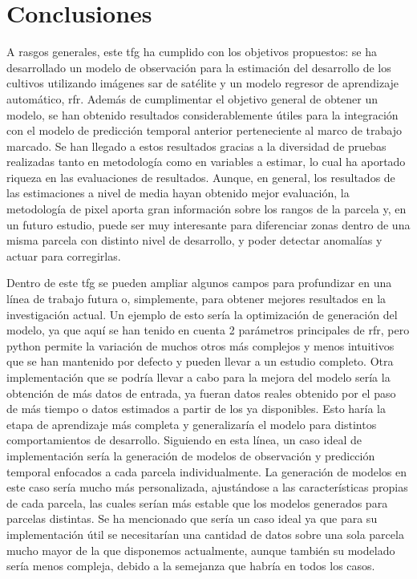 
\chapter{Conclusiones}
\label{conclusiones}
\par A rasgos generales, este \gls{tfg} ha cumplido con los objetivos propuestos: se ha desarrollado un modelo de observación para la estimación del desarrollo de los cultivos utilizando imágenes \gls{sar} de satélite y un modelo regresor de aprendizaje automático, \gls{rfr}. Además de cumplimentar el objetivo general de obtener un modelo, se han obtenido resultados considerablemente útiles para la integración con el modelo de predicción temporal anterior perteneciente al marco de trabajo marcado. Se han llegado a estos resultados gracias a la diversidad de pruebas realizadas tanto en metodología como en variables a estimar, lo cual ha aportado riqueza en las evaluaciones de resultados. Aunque, en general, los resultados de las estimaciones a nivel de media hayan obtenido mejor evaluación, la metodología de pixel aporta gran información sobre los rangos de la parcela y, en un futuro estudio, puede ser muy interesante para diferenciar zonas dentro de una misma parcela con distinto nivel de desarrollo, y poder detectar anomalías y actuar para corregirlas. 
\\
\par Dentro de este \gls{tfg} se pueden ampliar algunos campos para profundizar en una línea de trabajo futura o, simplemente,  para obtener mejores resultados en la investigación actual. Un ejemplo de esto sería la optimización de generación del modelo, ya que aquí se han tenido en cuenta 2 parámetros principales de \gls{rfr}, pero python permite la variación de muchos otros más complejos y menos intuitivos que se han mantenido por defecto y pueden llevar a un estudio completo. Otra implementación que se podría llevar a cabo para la mejora del modelo sería la obtención de más datos de entrada, ya fueran datos reales obtenido por el paso de más tiempo o datos estimados a partir de los ya disponibles. Esto haría la etapa de aprendizaje más completa y generalizaría el modelo para distintos comportamientos de desarrollo. Siguiendo en esta línea, un caso ideal de implementación sería la generación de modelos de observación y predicción temporal enfocados a cada parcela individualmente. La generación de modelos en este caso sería mucho más personalizada, ajustándose a las características propias de cada parcela, las cuales serían más estable que los modelos generados para parcelas distintas. Se ha mencionado que sería un caso ideal ya que para su implementación útil se necesitarían una cantidad de datos sobre una sola parcela mucho mayor de la que disponemos actualmente, aunque también su modelado sería menos compleja, debido a la semejanza que habría en todos los casos. 
